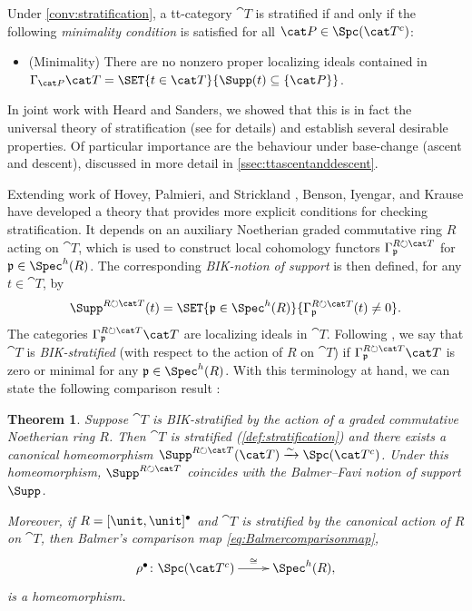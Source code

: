 \documentclass{amsart}%
\numberwithin{equation}{section}%
\newtheorem{Thm}[subsection]{Theorem}
\theoremstyle{remark}
\begin{document}
Under \cref{conv:stratification}, a tt-category $\cat T$ is stratified if and only if the following \emph{minimality condition} is satisfied for all $\cat P \in \Spc(\cat T^c)$:
\begin{itemize}
    \item[] (Minimality) There are no nonzero proper localizing ideals contained in $\Gamma_{\cat P}\cat T = \SET{t \in \cat T}{\Supp(t) \subseteq \{\cat P\}}$.
\end{itemize}
In joint work with Heard and Sanders, we showed that this is in fact the universal theory of stratification (see \cite[Sec.~7]{bhs1} for details) and establish several desirable properties. Of particular importance are the behaviour under base-change (ascent and descent), discussed in more detail in \cref{ssec:ttascentanddescent}.

Extending work of Hovey, Palmieri, and Strickland \cite{HoveyPalmieriStrickland97}, Benson, Iyengar, and Krause \cite{BensonIyengarKrause08,BensonIyengarKrause11b} have developed a theory that provides more explicit conditions for checking stratification. It depends on an auxiliary Noetherian graded commutative ring $R$ acting on $\cat T$, which is used to construct local cohomology functors $\Gamma_{\frak p}^{R \circlearrowright \cat T}$ for $\frak p \in \Spec^h(R)$. The corresponding \emph{BIK-notion of support} is then defined, for any $t \in \cat T$, by
\[
\Supp^{R \circlearrowright \cat T}(t) = \SET{\frak p \in \Spec^h(R)}{\Gamma_{\frak p}^{R \circlearrowright \cat T}(t) \neq 0}.
\]
The categories $\Gamma_{\frak p}^{R \circlearrowright \cat T}\cat T$ are localizing ideals in $\cat T$. Following \cite{BensonIyengarKrause11b}, we say that $\cat T$ is \emph{BIK-stratified} (with respect to the action of $R$ on $\cat T$) if $\Gamma_{\frak p}^{R \circlearrowright \cat T}\cat T$ is zero or minimal for any $\frak p \in \Spec^h(R)$. With this terminology at hand, we can state the following comparison result \cite[Cor.~7.11]{bhs1}:

\begin{Thm}\label{thm:ttstratificationuniversality}
Suppose $\cat T$ is BIK-stratified by the action of a graded commutative Noetherian ring $R$. Then $\cat T$ is stratified (\cref{def:stratification}) and there exists a canonical homeomorphism $\Supp^{R \circlearrowright \cat T}(\cat T) \xrightarrow{\sim}\Spc(\cat T^c)$. Under this homeomorphism, $\Supp^{R \circlearrowright \cat T}$ coincides with the Balmer--Favi notion of support $\Supp$.

Moreover, if $R = [\unit,\unit]^{\bullet}$ and $\cat T$ is stratified by the canonical action of $R$ on $\cat T$, then Balmer's comparison map \eqref{eq:Balmercomparisonmap},
\[
\xymatrix{\rho^{\bullet}\colon \Spc(\cat T^c) \ar[r]^-{\cong} & \Spec^h(R),}
\]
is a homeomorphism.
\end{Thm}
\end{document}
